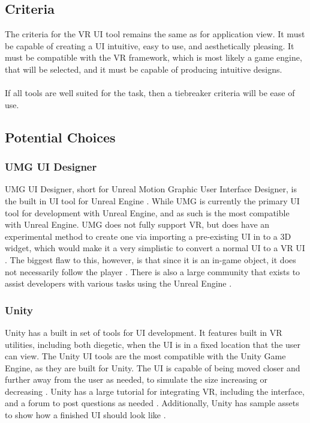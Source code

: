 \documentclass[onecolumn, draftclsnofoot,10pt, compsoc]{IEEEtran}
\begin{document}
\subsection{Criteria}
The criteria for the VR UI tool remains the same as for application view. It must be capable of creating a UI intuitive, easy to use, and aesthetically pleasing. It must be compatible with the VR framework, which is most likely a game engine, that will be selected, and it must be capable of producing intuitive designs.
\\
\\
If all tools are well suited for the task, then a tiebreaker criteria will be ease of use.
\subsection{Potential Choices}
\subsubsection{UMG UI Designer}
UMG UI Designer, short for Unreal Motion Graphic User Interface Designer, is the built in UI tool for Unreal Engine \cite{J2}. While UMG is currently the primary UI tool for development with Unreal Engine, and as such is the most compatible with Unreal Engine. UMG does not fully support VR, but does have an experimental method to create one via importing a pre-existing UI in to a 3D widget, which would make it a very simplistic to convert a normal UI to a VR UI \cite{J8}. The biggest flaw to this, however, is that since it is an in-game object, it does not necessarily follow the player \cite{J8}. There is also a large community that exists to assist developers with various tasks using the Unreal Engine \cite{J2}.

\subsubsection{Unity}
Unity has a built in set of tools for UI development. It features built in VR utilities, including both diegetic, when the UI is in a fixed location that the user can view. The Unity UI tools are the most compatible with the Unity Game Engine, as they are built for Unity. The UI is capable of being moved closer and further away from the user as needed, to simulate the size increasing or decreasing \cite{J9}. Unity has a large tutorial for integrating VR, including the interface, and a forum to post questions as needed \cite{J9}. Additionally, Unity has sample assets to show how a finished UI should look like \cite{J9}. 
\end{document}

